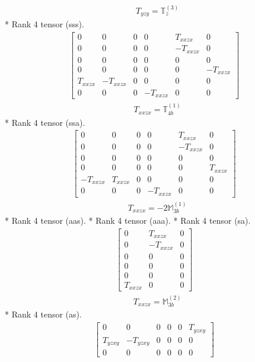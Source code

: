 \documentclass[fleqn,8pt,landscape]{jsarticle}
\begin{document}
\begin{align*}
& T_{yzy} = \mathbb{T}_{z}^{(3)}
\end{align*}
* Rank 4 tensor (sss).
\begin{align*}
\begin{bmatrix} 0 & 0 & 0 & 0 & T_{xxzx} & 0 \\ 0 & 0 & 0 & 0 & - T_{xxzx} & 0 \\ 0 & 0 & 0 & 0 & 0 & 0 \\ 0 & 0 & 0 & 0 & 0 & - T_{xxzx} \\ T_{xxzx} & - T_{xxzx} & 0 & 0 & 0 & 0 \\ 0 & 0 & 0 & - T_{xxzx} & 0 & 0 \end{bmatrix}
\end{align*}
\begin{align*}
& T_{xxzx} = \mathbb{T}_{4b}^{(1)}
\end{align*}
* Rank 4 tensor (ssa).
\begin{align*}
\begin{bmatrix} 0 & 0 & 0 & 0 & T_{xxzx} & 0 \\ 0 & 0 & 0 & 0 & - T_{xxzx} & 0 \\ 0 & 0 & 0 & 0 & 0 & 0 \\ 0 & 0 & 0 & 0 & 0 & T_{xxzx} \\ - T_{xxzx} & T_{xxzx} & 0 & 0 & 0 & 0 \\ 0 & 0 & 0 & - T_{xxzx} & 0 & 0 \end{bmatrix}
\end{align*}
\begin{align*}
& T_{xxzx} = - 2 \mathbb{M}_{3b}^{(1)}
\end{align*}
* Rank 4 tensor (aas).
* Rank 4 tensor (aaa).
* Rank 4 tensor (sa).
\begin{align*}
\begin{bmatrix} 0 & T_{xxzx} & 0 \\ 0 & - T_{xxzx} & 0 \\ 0 & 0 & 0 \\ 0 & 0 & 0 \\ 0 & 0 & 0 \\ T_{xxzx} & 0 & 0 \end{bmatrix}
\end{align*}
\begin{align*}
& T_{xxzx} = \mathbb{M}_{3b}^{(2)}
\end{align*}
* Rank 4 tensor (as).
\begin{align*}
\begin{bmatrix} 0 & 0 & 0 & 0 & 0 & T_{yzxy} \\ T_{yzxy} & - T_{yzxy} & 0 & 0 & 0 & 0 \\ 0 & 0 & 0 & 0 & 0 & 0 \end{bmatrix}
\end{align*}
\end{document}
